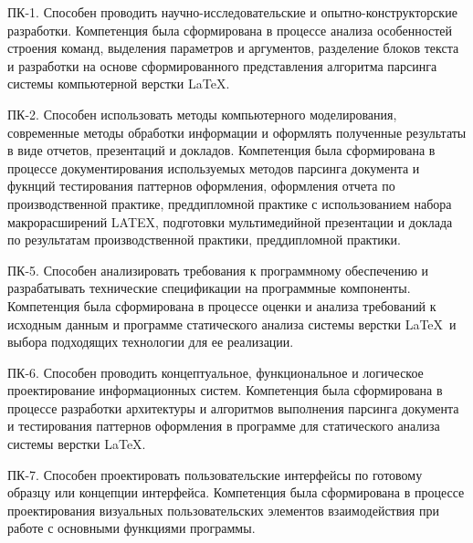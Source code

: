 ПК-1. Способен проводить научно-исследовательские и опытно-конструкторские разработки. 
Компетенция была сформирована в процессе анализа особенностей строения команд, выделения параметров и аргументов, разделение блоков текста и разработки на основе сформированного представления алгоритма парсинга  системы компьютерной верстки \LaTeX.

ПК-2. Способен использовать методы компьютерного моделирования, современные методы обработки информации и оформлять полученные результаты в виде отчетов, презентаций и докладов. 
Компетенция была сформирована в процессе документирования используемых методов парсинга документа и фукнций тестирования паттернов оформления, оформления отчета по производственной практике, преддипломной практике с использованием набора макрорасширений LATEX, подготовки мультимедийной презентации и доклада по результатам производственной практики, преддипломной практики.


ПК-5. Способен анализировать требования к программному обеспечению и разрабатывать технические спецификации на программные компоненты. 
Компетенция была сформирована в процессе оценки и анализа требований к исходным данным и программе статического анализа системы верстки \LaTeX \ и выбора подходящих технологии для ее реализации.



ПК-6. Способен проводить концептуальное, функциональное и логическое проектирование информационных систем. 
Компетенция была сформирована в процессе разработки архитектуры и алгоритмов выполнения парсинга документа и тестирования паттернов оформления в программе для статического анализа системы верстки \LaTeX.


ПК-7. Способен проектировать пользовательские интерфейсы по готовому образцу или концепции интерфейса. 
Компетенция была сформирована в процессе проектирования визуальных пользовательских элементов взаимодействия при работе с основными функциями программы.
